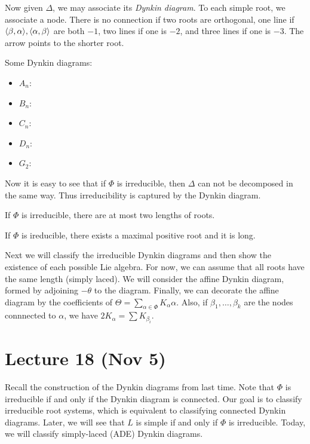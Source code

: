 \documentclass[twoside, 10pt]{article}
\begin{document}
    Now given $\Delta$, we may associate its \textit{Dynkin diagram}. To each
    simple root, we associate a node. There is no connection if two roots are
    orthogonal, one line if $\langle\beta,\alpha\rangle, \langle\alpha,\beta\rangle$ are both
    $-1$, two lines if one is $-2$, and three lines if one is $-3$. The arrow
    points to the shorter root.

    \begin{exm} Some Dynkin diagrams: \begin{itemize} \item $A_n$: 
    \item $B_n$:  \item $C_n$:  \item $D_n$:
 \item $G_2$:  \end{itemize} \end{exm}

    Now it is easy to see that if $\Phi$ is irreducible, then $\Delta$ can not
    be decomposed in the same way. Thus irreducibility is captured by the
    Dynkin diagram.

    \begin{prop} If $\Phi$ is irreducible, there are at most two lengths of
    roots.  \end{prop}

    \begin{prop} If $\Phi$ is ireducible, there exists a maximal positive root
    and it is long.  \end{prop}

    Next we will classify the irreducible Dynkin diagrams and then show the
    existence of each possible Lie algebra. For now, we can assume that all
    roots have the same length (simply laced). We will consider the affine
    Dynkin diagram, formed by adjoining $-\theta$ to the diagram. Finally, we
    can decorate the affine diagram by the coefficients of $\Theta =
    \sum_{\alpha \in \Phi} K_{\alpha} \alpha$. Also, if $\beta_1, \ldots,
    \beta_k$ are the nodes connnected to $\alpha$, we have $2K_{\alpha} = \sum
    K_{\beta_i}$.

    \section{Lecture 18 (Nov 5)}%
    
    Recall the construction of the Dynkin diagrams from last time. Note that
    $\Phi$ is irreducible if and only if the Dynkin diagram is connected. Our
    goal is to classify irreducible root systems, which is equivalent to
    classifying connected Dynkin diagrams. Later, we will see that $L$ is
    simple if and only if $\Phi$ is irreducible. Today, we will classify
    simply-laced (ADE) Dynkin diagrams.
\end{document}
